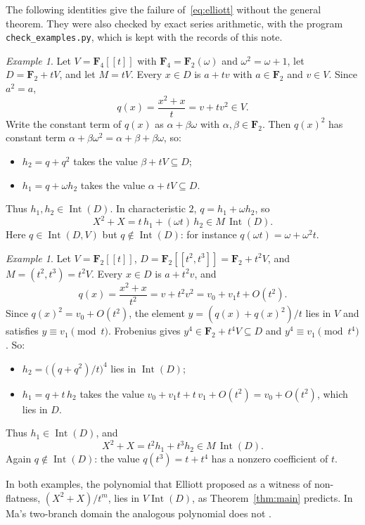 \documentclass[11pt,a4paper]{article}
\theoremstyle{plain}
\theoremstyle{remark}
\newtheorem{example}[theorem]{Example}
\newcommand{\F}{\mathbf F}
\newcommand{\Int}{\operatorname{Int}}
\begin{document}
The following identities give the failure of~\eqref{eq:elliott} without the general theorem. They were also checked
by exact series arithmetic, with the program \texttt{check\_examples.py}, which is kept with the records of this note.

\begin{example}\label{ex:f4}
Let $V=\F_4[[t]]$ with $\F_4=\F_2(\omega)$ and $\omega^2=\omega+1$, let $D=\F_2+tV$, and let $M=tV$. Every $x\in D$
is $a+tv$ with $a\in\F_2$ and $v\in V$. Since $a^2=a$,
\[
 q(x)=\frac{x^2+x}{t}=v+tv^2\in V .
\]
Write the constant term of $q(x)$ as $\alpha+\beta\omega$ with $\alpha,\beta\in\F_2$. Then $q(x)^2$ has constant term
$\alpha+\beta\omega^2=\alpha+\beta+\beta\omega$, so:
\begin{itemize}
\item $h_2=q+q^2$ takes the value $\beta+tV\subseteq D$;
\item $h_1=q+\omega h_2$ takes the value $\alpha+tV\subseteq D$.
\end{itemize}
Thus $h_1,h_2\in\Int(D)$. In characteristic $2$, $q=h_1+\omega h_2$, so
\[
 X^2+X=t\,h_1+(\omega t)\,h_2\in M\,\Int(D).
\]
Here $q\in\Int(D,V)$ but $q\notin\Int(D)$: for instance $q(\omega t)=\omega+\omega^2t$.
\end{example}

\begin{example}\label{ex:cusp}
Let $V=\F_2[[t]]$, $D=\F_2[[t^2,t^3]]=\F_2+t^2V$, and $M=(t^2,t^3)=t^2V$. Every $x\in D$ is $a+t^2v$, and
\[
 q(x)=\frac{x^2+x}{t^2}=v+t^2v^2=v_0+v_1t+O(t^2).
\]
Since $q(x)^2=v_0+O(t^2)$, the element $y=(q(x)+q(x)^2)/t$ lies in $V$ and satisfies $y\equiv v_1\pmod t$. Frobenius
gives $y^4\in\F_2+t^4V\subseteq D$ and $y^4\equiv v_1\pmod{t^4}$. So:
\begin{itemize}
\item $h_2=\bigl((q+q^2)/t\bigr)^4$ lies in $\Int(D)$;
\item $h_1=q+t\,h_2$ takes the value $v_0+v_1t+t\,v_1+O(t^2)=v_0+O(t^2)$, which lies in $D$.
\end{itemize}
Thus $h_1\in\Int(D)$, and
\[
 X^2+X=t^2h_1+t^3h_2\in M\,\Int(D).
\]
Again $q\notin\Int(D)$: the value $q(t^3)=t+t^4$ has a nonzero coefficient of $t$.
\end{example}

In both examples, the polynomial that Elliott proposed as a witness of non-flatness, $(X^2+X)/t^m$, lies in
$V\Int(D)$, as Theorem~\ref{thm:main} predicts. In Ma's two-branch domain the analogous polynomial does not
\cite[Proposition~4.1]{Ma}.
\end{document}
